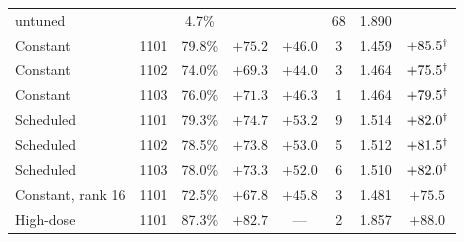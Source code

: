 \documentclass{article}
\begin{document}
\begin{table}[!htbp]
\begin{tabular}{@{}l c c c c c c c@{}}
    untuned & & 4.7\% & & & 68 & 1.890 & \\
    Constant & 1101 & 79.8\% & $+75.2$ & $+46.0$ & 3 & 1.459 & $+85.5^{\smash{\dagger}}$ \\
    Constant & 1102 & 74.0\% & $+69.3$ & $+44.0$ & 3 & 1.464 & $+75.5^{\smash{\dagger}}$ \\
    Constant & 1103 & 76.0\% & $+71.3$ & $+46.3$ & 1 & 1.464 & $+79.5^{\smash{\dagger}}$ \\
    Scheduled & 1101 & 79.3\% & $+74.7$ & $+53.2$ & 9 & 1.514 & $+82.0^{\smash{\dagger}}$ \\
    Scheduled & 1102 & 78.5\% & $+73.8$ & $+53.0$ & 5 & 1.512 & $+81.5^{\smash{\dagger}}$ \\
    Scheduled & 1103 & 78.0\% & $+73.3$ & $+52.0$ & 6 & 1.510 & $+82.0^{\smash{\dagger}}$ \\
    Constant, rank 16 & 1101 & 72.5\% & $+67.8$ & $+45.8$ & 3 & 1.481 & $+75.5$ \\
    High-dose & 1101 & 87.3\% & $+82.7$ & --- & 2 & 1.857 & $+88.0$ \\

\end{tabular}
\end{table}
\end{document}
